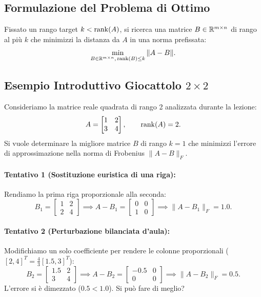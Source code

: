 \subsection{Formulazione del Problema di Ottimo}

Fissato un rango target $k < \operatorname{rank}(A)$, si ricerca una matrice $B \in \mathbb{R}^{m \times n}$ di rango al pi\`u $k$ che minimizzi la distanza da $A$ in una norma prefissata:
\begin{equation}
    \min_{B \in \mathbb{R}^{m \times n}, \, \operatorname{rank}(B) \le k} \|A - B\|.
\end{equation}

\subsection{Esempio Introduttivo Giocattolo $2 \times 2$}

Consideriamo la matrice reale quadrata di rango 2 analizzata durante la lezione:
\begin{equation}
    A = \begin{bmatrix} 1 & 2 \\ 3 & 4 \end{bmatrix}, \qquad \operatorname{rank}(A) = 2.
\end{equation}
Si vuole determinare la migliore matrice $B$ di rango $k = 1$ che minimizzi l'errore di approssimazione nella norma di Frobenius $\|A - B\|_F$.

\paragraph{Tentativo 1 (Sostituzione euristica di una riga):}
Rendiamo la prima riga proporzionale alla seconda:
\begin{equation}
    B_1 = \begin{bmatrix} 1 & 2 \\ 2 & 4 \end{bmatrix} \implies A - B_1 = \begin{bmatrix} 0 & 0 \\ 1 & 0 \end{bmatrix} \implies \|A - B_1\|_F = 1.0.
\end{equation}

\paragraph{Tentativo 2 (Perturbazione bilanciata d'aula):}
Modifichiamo un solo coefficiente per rendere le colonne proporzionali ($[2, 4]^T = \frac{4}{3}[1.5, 3]^T$):
\begin{equation}
    B_2 = \begin{bmatrix} 1.5 & 2 \\ 3 & 4 \end{bmatrix} \implies A - B_2 = \begin{bmatrix} -0.5 & 0 \\ 0 & 0 \end{bmatrix} \implies \|A - B_2\|_F = 0.5.
\end{equation}
L'errore si \`e dimezzato ($0.5 < 1.0$). Si pu\`o fare di meglio?

